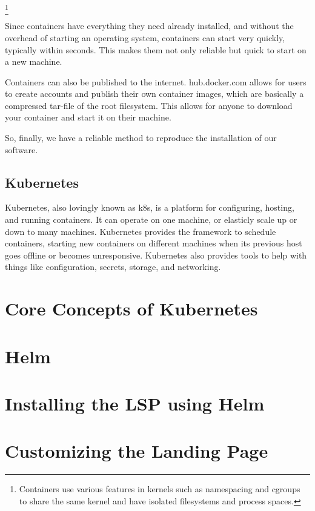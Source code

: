 \documentclass[11pt,twoside]{article}
\begin{document}
\footnote{Containers use various features in kernels such as namespacing and cgroups
to share the same kernel and have isolated filesystems and process spaces.}

Since containers have everything they need already installed, and without the overhead of
starting an operating system, containers can start very quickly, typically within seconds.
This makes them not only reliable but quick to start on a new machine.

Containers can also be published to the internet.  hub.docker.com allows for users to
create accounts and publish their own container images, which are basically a compressed
tar-file of the root filesystem.  This allows for anyone to download your container and
start it on their machine.

So, finally, we have a reliable method to reproduce the installation of our software.

\subsection{Kubernetes}

Kubernetes, also lovingly known as k8s, is a platform for configuring, hosting, and
running containers.  It can operate on one machine, or elasticly scale up or down to many machines.
Kubernetes provides the framework to schedule containers, starting new
containers on different machines when its previous host goes offline or becomes unresponsive.  Kubernetes
also provides tools to help with things like configuration, secrets, storage, and networking.

\section{Core Concepts of Kubernetes}

\section{Helm}

\section{Installing the LSP using Helm}

\section{Customizing the Landing Page}
\end{document}
